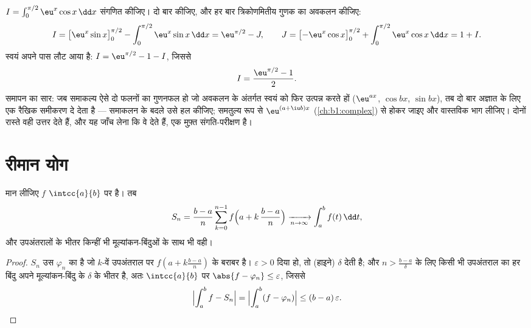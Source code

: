 \begin{example}[लौटता हुआ समाकल]\label{ex:b1:integration:boomerang}
$I = \int_0^{\pi/2} \eu^x \cos x\,\dd x$ संगणित कीजिए। दो बार 
कीजिए, और हर बार त्रिकोणमितीय गुणक का अवकलन कीजिए:
\[
I = \bigl[\eu^x \sin x\bigr]_0^{\pi/2}
- \int_0^{\pi/2} \eu^x \sin x\,\dd x
= \eu^{\pi/2} - J,
\qquad
J = \bigl[-\eu^x\cos x\bigr]_0^{\pi/2}
+ \int_0^{\pi/2} \eu^x\cos x\,\dd x = 1 + I .
\]
 स्वयं अपने पास लौट आया है: $I = \eu^{\pi/2} - 1 - I$, जिससे
\[
I = \frac{\eu^{\pi/2} - 1}{2} .
\]
समापन का सार: जब समाकल्य ऐसे दो फलनों का गुणनफल हो जो अवकलन के अंतर्गत स्वयं
को फिर उत्पन्न करते हों ($\eu^{ax}$, $\cos bx$, $\sin bx$), तब दो बार  अज्ञात  के लिए एक रैखिक समीकरण दे देता है --- समाकलन के बदले उसे
हल कीजिए; समतुल्य रूप से $\eu^{(a + \iu b)x}$ (\cref{ch:b1:complex}) से होकर
जाइए और वास्तविक भाग लीजिए। दोनों रास्ते वही उत्तर देते हैं, और यह जाँच लेना
कि वे देते हैं, एक मुफ़्त संगति-परीक्षण है।
\end{example}

\section{रीमान योग}

\begin{theorem}[रीमान योग]\label{thm:b1:integration:riemann}
मान लीजिए $f$ $\intcc{a}{b}$ पर  है। तब
\[
S_n = \frac{b - a}{n} \sum_{k=0}^{n-1}
f\Bigl(a + k\,\frac{b-a}{n}\Bigr)
\xrightarrow[n \to \infty]{} \int_a^b f(t)\, \dd t ,
\]
और उपअंतरालों के भीतर किन्हीं भी मूल्यांकन-बिंदुओं के साथ भी वही।
\end{theorem}

\begin{proof}
$S_n$ उस  $\varphi_n$ का  है जो $k$-वें उपअंतराल पर $f(a +
k\frac{b-a}{n})$ के बराबर है। $\varepsilon > 0$ दिया हो, तो 
(हाइने) $\delta$ देती है; और $n > \frac{b-a}{\delta}$ के लिए किसी भी
उपअंतराल का हर बिंदु अपने मूल्यांकन-बिंदु के $\delta$ के भीतर है, अतः
$\intcc{a}{b}$ पर $\abs{f - \varphi_n} \leq \varepsilon$, जिससे
\[
\Bigl| \int_a^b f - S_n \Bigr|
= \Bigl| \int_a^b (f - \varphi_n) \Bigr|
\leq (b-a)\,\varepsilon . \qedhere
\]
\end{proof}

